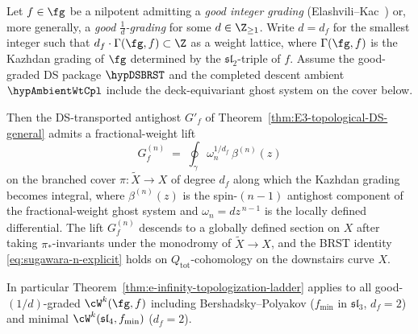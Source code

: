 \begin{proposition}
\label{prop:fractional-ghost-branched-cover}
Let $f \in \fg$ be a nilpotent admitting a \emph{good integer grading}
\textup{(}Elashvili--Kac~\cite{Elashvili-Kac}\textup{)} or, more
generally, a \emph{good $\tfrac{1}{d}$-grading} for some
$d \in \Z_{\ge 1}$. Write $d = d_f$ for the smallest integer such that
$d_f \cdot \Gamma(\fg, f) \subset \Z$ as a weight lattice, where
$\Gamma(\fg, f)$ is the Kazhdan grading of $\fg$ determined by the
$\mathfrak{sl}_2$-triple of $f$. Assume the good-graded DS package
\(\hypDSBRST\) and the completed descent ambient \(\hypAmbientWtCpl\)
include the deck-equivariant ghost system on the cover below.

Then the DS-transported antighost $G'_f$ of
Theorem~\textup{\ref{thm:E3-topological-DS-general}} admits a
fractional-weight lift
\begin{equation}\label{eq:Gn-fractional}
G^{(n)}_{f}
\;=\;
\oint_\gamma \omega_n^{1/d_f}\,\beta^{(n)}(z)
\end{equation}
on the branched cover $\pi \colon \widetilde X \to X$ of degree $d_f$
along which the Kazhdan grading becomes integral, where
$\beta^{(n)}(z)$ is the spin-$(n-1)$ antighost component of the
fractional-weight ghost system and $\omega_n = dz^{\,n-1}$ is the
locally defined differential. The lift $G^{(n)}_f$ descends to a
globally defined section on $X$ after taking $\pi_*$-invariants under
the monodromy of $\widetilde X \to X$, and the BRST identity
\eqref{eq:sugawara-n-explicit} holds on $Q_{\mathrm{tot}}$-cohomology
on the downstairs curve $X$.

In particular Theorem~\ref{thm:e-infinity-topologization-ladder}
applies to all good-$(1/d)$-graded $\cW^k(\fg, f)$ including
Bershadsky--Polyakov \textup{(}$f_{\min}$ in $\mathfrak{sl}_3$,
$d_f = 2$\textup{)} and minimal $\cW^k(\mathfrak{sl}_4, f_{\min})$
\textup{(}$d_f = 2$\textup{)}.
\end{proposition}


